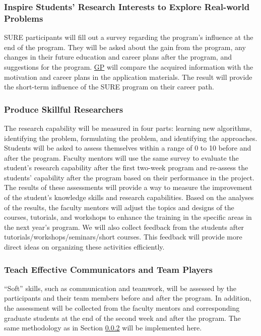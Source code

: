 \documentclass[11pt]{NSFamsart}
\newcommand{\GP}{\hyperlink{GPlink}{GP}\xspace}
\begin{document}
\subsubsection{
Inspire Students' Research Interests to Explore Real-world Problems}

SURE participants will fill out a survey regarding the program's influence at the end of the program. They will be asked about the gain from the program, any changes in their future education and career plans after the program, and suggestions for the program. \GP will compare the acquired information with the motivation and career plans in the application materials. The result will provide the short-term influence of the SURE program on their career path.


\subsubsection{Produce Skillful Researchers} \label{sec:hardskill}
The research capability will be measured in four parts: learning new algorithms, identifying the problem, formulating the problem, and identifying the approaches.
Students will be asked to assess themselves within a range of 0 to 10 before and after the program. Faculty mentors will use the same survey to evaluate the student's research capability after the first two-week program and re-assess the students’ capability after the program based on their performance in the project.
The results of these assessments will provide a way to measure the improvement of the student's knowledge skills and research capabilities. Based on the analyses of the results, the faculty mentors will adjust the topics and designs of the courses, tutorials,  and workshops to enhance the training in the specific areas in the next year's program.
We will also collect feedback from the students after tutorials/workshops/seminars/short courses. This feedback will provide more direct ideas on organizing these activities efficiently.

\subsubsection{Teach Effective Communicators and Team Players}

``Soft'' skills, such as communication and teamwork, will be assessed by the participants and their team members before and after the program. In addition, the assessment will be collected from the faculty mentors and corresponding graduate students at the end of the second week and after the program. The same methodology as in Section \ref{sec:hardskill} will be implemented here. 
\end{document}
